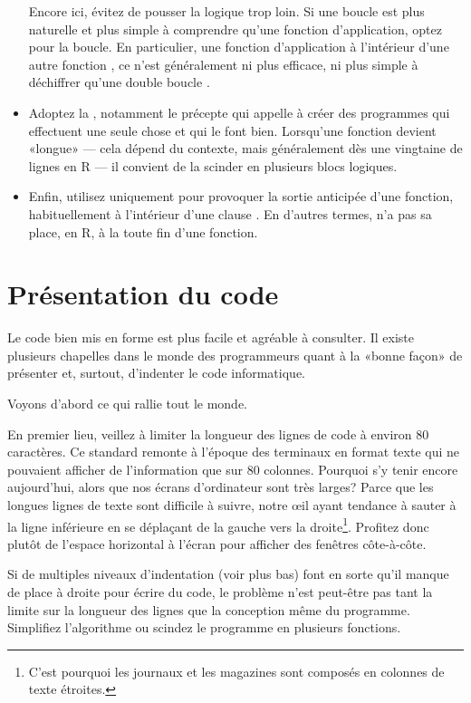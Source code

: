 \begin{itemize}
  Encore ici, évitez de pousser la logique trop loin. Si une boucle
  est plus naturelle et plus simple à comprendre qu'une fonction
  d'application, optez pour la boucle. En particulier, une
  fonction d'application  à l'intérieur d'une autre
  fonction , ce n'est généralement ni plus efficace, ni
  plus simple à déchiffrer qu'une double boucle .
\item Adoptez la
  , notamment le précepte qui appelle à créer des programmes
  qui effectuent une seule chose et qui le font bien. Lorsqu'une
  fonction devient «longue» --- cela dépend du contexte, mais
  généralement dès une vingtaine de lignes en R --- il convient de la
  scinder en plusieurs blocs logiques.
\item Enfin, utilisez  uniquement pour provoquer la
  sortie anticipée d'une fonction, habituellement à l'intérieur d'une
  clause . En d'autres termes,  n'a pas sa
  place, en R, à la toute fin d'une fonction.
\end{itemize}


\section{Présentation du code}
\label{sec:collaboration:presentation}

Le code bien mis en forme est plus facile et agréable à consulter. Il
existe plusieurs chapelles dans le monde des programmeurs quant à la
«bonne façon» de présenter et, surtout, d'indenter le code
informatique.

Voyons d'abord ce qui rallie tout le monde.

En premier lieu, veillez à limiter la longueur des lignes de code à
environ 80 caractères. Ce standard remonte à l'époque des terminaux en
format texte qui ne pouvaient afficher de l'information que sur 80
colonnes. Pourquoi s'y tenir encore aujourd'hui, alors que nos écrans
d'ordinateur sont très larges? Parce que les longues lignes de texte
sont difficile à suivre, notre œil ayant tendance à sauter à la ligne
inférieure en se déplaçant de la gauche vers la droite\footnote{%
  C'est pourquoi les journaux et les magazines sont composés en
  colonnes de texte étroites.}. %
Profitez donc plutôt de l'espace horizontal à l'écran pour afficher
des fenêtres côte-à-côte.

Si de multiples niveaux d'indentation (voir plus bas) font en sorte
qu'il manque de place à droite pour écrire du code, le problème n'est
peut-être pas tant la limite sur la longueur des lignes que la
conception même du programme. Simplifiez l'algorithme ou scindez le
programme en plusieurs fonctions.

